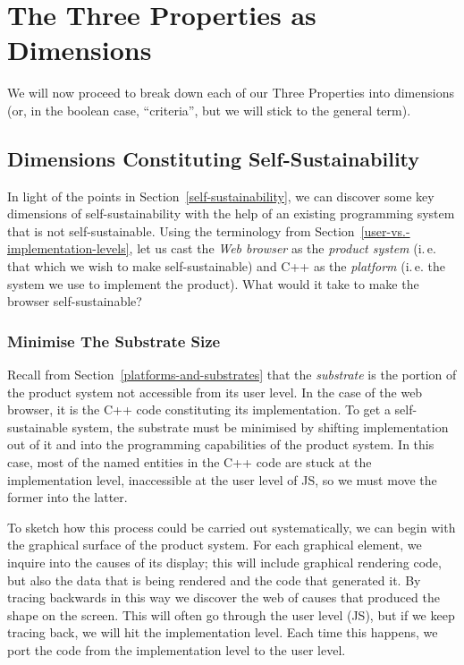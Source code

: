 \documentclass[ twoside,openright,titlepage,numbers=noenddot,headinclude,footinclude,cleardoublepage=empty,abstract=on,
                BCOR=5mm,paper=a4,fontsize=11pt
                ]{scrreprt}
\newcommand{\ie}{i.\,e.}
\theoremstyle{definition}
\begin{document}
\hypertarget{the-three-properties-as-dimensions}{\section{The Three Properties as
Dimensions}\label{the-three-properties-as-dimensions}}

We will now proceed to break down each of our Three Properties into
dimensions (or, in the boolean case, ``criteria'', but we will stick to
the general term).

\hypertarget{dimensions-constituting-self-sustainability}{\subsection{Dimensions Constituting
Self-Sustainability}\label{dimensions-constituting-self-sustainability}}

In light of the points in Section~\ref{self-sustainability}, we can
discover some key dimensions of self-sustainability with the help of an
existing programming system that is not self-sustainable. Using the
terminology from Section~\ref{user-vs.-implementation-levels}, let us
cast the \emph{Web browser} as the \emph{product system} (\ie{} that
which we wish to make self-sustainable) and C++ as the \emph{platform}
(\ie{} the system we use to implement the product). What would it take
to make the browser self-sustainable?

\hypertarget{minimise-the-substrate-size}{\subsubsection{Minimise The Substrate
Size}\label{minimise-the-substrate-size}}

Recall from Section~\ref{platforms-and-substrates} that the
\emph{substrate} is the portion of the product system not accessible
from its user level. In the case of the web browser, it is the C++ code
constituting its implementation. To get a self-sustainable system, the
substrate must be minimised by shifting implementation out of it and
into the programming capabilities of the product system. In this case,
most of the named entities in the C++ code are stuck at the
implementation level, inaccessible at the user level of \ac{JS}, so we
must move the former into the latter.

To sketch how this process could be carried out systematically, we can
begin with the graphical surface of the product system. For each
graphical element, we inquire into the causes of its display; this will
include graphical rendering code, but also the data that is being
rendered and the code that generated it. By tracing backwards in this
way we discover the web of causes that produced the shape on the screen.
This will often go through the user level (\ac{JS}), but if we keep
tracing back, we will hit the implementation level. Each time this
happens, we port the code from the implementation level to the user
level.
\end{document}
